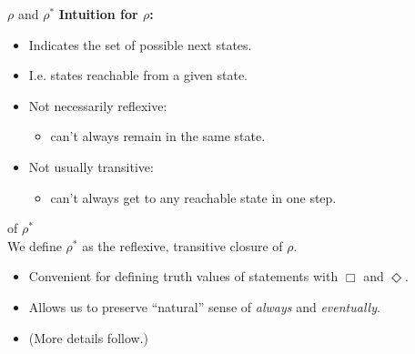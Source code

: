 \begin{wideslide}[bm=,toc=]{$\rho$ and $\rho^*$}
\textbf{Intuition for $\rho$:}
\begin{itemize}
\item<2-> Indicates the set of possible next states.
\item<3-> I.e. states reachable from a given state.
\item<4-> Not necessarily reflexive: 
\begin{itemize}
\item<5-> can't always remain in the same state.
\end{itemize}
\item<6-> Not usually transitive:
\begin{itemize}
\item<7-> can't always get to any reachable state in one step.  
\end{itemize}
\end{itemize}
\pause[7]
\begin{defn}{of $\rho^*$}~\\
\pause
We define $\rho^*$ as the reflexive, transitive closure of $\rho$.
\end{defn}
\pause
\vspace{-5mm}
\begin{itemize}
\item Convenient for defining truth values of statements with $\Box$ and
$\Diamond$.
\item Allows us to preserve ``natural'' sense of \emph{always} and
\emph{eventually}.
\item (More details follow.)
\end{itemize}

\end{wideslide}


